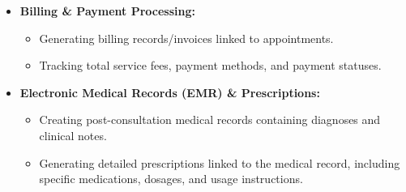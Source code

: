 \begin{itemize}
    \item \textbf{Billing \& Payment Processing:}
    \begin{itemize}
        \item Generating billing records/invoices linked to appointments.
        \item Tracking total service fees, payment methods, and payment statuses.
    \end{itemize}

    \item \textbf{Electronic Medical Records (EMR) \& Prescriptions:}
    \begin{itemize}
        \item Creating post-consultation medical records containing diagnoses and clinical notes.
        \item Generating detailed prescriptions linked to the medical record, including specific medications, dosages, and usage instructions.
    \end{itemize}
\end{itemize}


